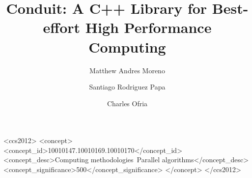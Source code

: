 \documentclass[sigconf]{acmart}
\begin{document}
\title{Conduit: A C++ Library for Best-effort High Performance Computing}

\author{Matthew Andres Moreno}

\author{Santiago Rodriguez Papa}

\author{Charles Ofria}

\renewcommand{\shortauthors}{Moreno et al.}


\begin{CCSXML}
<ccs2012>
<concept>
<concept_id>10010147.10010169.10010170</concept_id>
<concept_desc>Computing methodologies~Parallel algorithms</concept_desc>
<concept_significance>500</concept_significance>
</concept>
</ccs2012>
\end{CCSXML}


\maketitle
\end{document}
